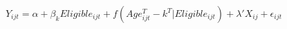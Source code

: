 \documentclass{article}%
\begin{document}

    \begin{equation}%
        Y_{ijt} = \alpha + \beta_kEligible_{ijt} + f (Age^T_{ijt}-k^T | 
        Eligible_{ijt}) + \lambda'X_{ij} + \epsilon_{ijt}
    \end{equation}
\end{document}
